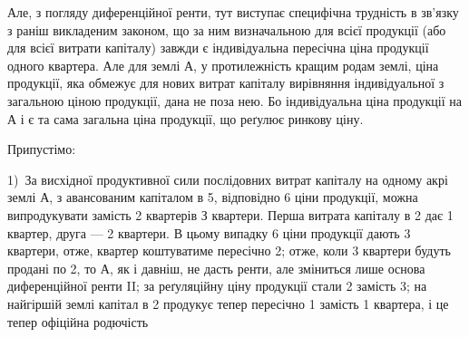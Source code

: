 Але, з погляду диференційної ренти, тут виступає специфічна трудність
в зв’язку з раніш викладеним законом, що за ним визначальною для всієї продукції
(або для всієї витрати капіталу) завжди є індивідуальна пересічна ціна
продукції одного квартера. Але для землі $А$, у протилежність кращим родам
землі, ціна продукції, яка обмежує для нових витрат капіталу вирівняння індивідуальної
з загальною ціною продукції, дана не поза нею. Бо індивідуальна ціна
продукції на $А$ і є та сама загальна ціна продукції, що реґулює ринкову ціну.

Припустімо:

1)~За висхідної продуктивної сили послідовних витрат
капіталу на одному акрі землі $А$, з авансованим капіталом в 5,
відповідно 6 ціни продукції, можна випродукувати замість 2 квартерів
З квартери. Перша витрата капіталу в 2 дає 1 квартер, друга — 2 квартери. В цьому
випадку 6 ціни продукції дають 3 квартери,
отже, квартер коштуватиме пересічно 2; отже, коли 3 квартери
будуть продані по 2, то $А$, як і давніш, не дасть ренти, але зміниться
лише основа диференційної ренти II; за реґуляційну ціну продукції стали
2 замість 3; на найгіршій землі капітал в 2
продукує тепер пересічно 1  замість 1 квартера, і це тепер офіційна родючість
\parbreak{}  %
